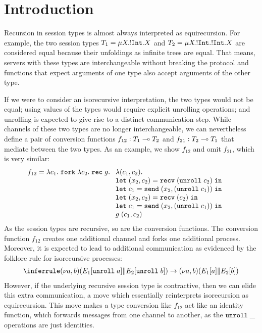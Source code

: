 
\section{Introduction}
\label{sec:introduction}

Recursion in session types is almost always interpreted as
equirecursion. For example, the two session types $T_1 = \mu X\!.{{}!\mathtt{Int}.X} $
and $T_2 = \mu X\!.{{}!\mathtt{Int}.{}!\mathtt{Int}.X} $ are considered equal because
their unfoldings as infinite trees are equal. That means, servers with
these types are interchangeable without breaking the protocol and
functions that expect arguments of one type also accept arguments of
the other type.

If we were to consider an isorecursive interpretation, the two types
would not be equal; using values of the types would require explicit
unrolling operations; and unrolling is expected to give rise to a distinct communication
step. While channels of these two types are no longer
interchangeable, we can nevertheless define a pair of conversion
functions
$f_{12} : T_1 \multimap T_2$
and
$f_{21} : T_2 \multimap T_1$
that mediate between the two types. As an example, we show $f_{12}$
and omit $f_{21}$, which is very similar:
\begin{align*}
  f_{12} &=       \ELam {c_1} \EFork{ \ELam {c_2} \ERec g %
      \begin{array}[t]{l}
      \ELam{(c_1, c_2)} \\
      \ELet{(x_2,c_2)}{\ERecv{(\EUnroll{c_2})}} \\
      \ELet{c_1}{\ESend{x_2}{(\EUnroll{c_1})}} \\
      \ELet{(x_2,c_2)}{\ERecv{({c_2})}} \\
      \ELet{c_1}{\ESend{x_2}{(\EUnroll{c_1})}} \\
        g \; ({c_1}, {c_2}) %
      \end{array}}
\end{align*}
As the session types are recursive, so are the conversion
functions. The conversion function $f_{12}$ creates one additional
channel and forks one additional process. Moreover, it is expected to
lead to additional communication as evidenced by the folklore rule for
isorecursive processes:
\begin{gather}
  \label{eq:3}
  \reducerule{
    \PScope (\PPar* {\EUnroll a} {\EUnroll b})
  }{
    \PScope (\PPar* a b)
  }
\end{gather}
However, if the underlying recursive session type is contractive, then we can
elide this extra communication, a move which essentially reinterprets
isorecursion as equirecursion.
This move makes a type conversion like $f_{12}$ act like an identity
function, which forwards messages from one channel to another, as the
$\mathtt{unroll}\; \_$ operations are just identities. 



